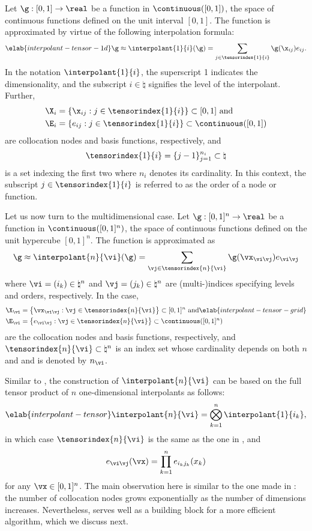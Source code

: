 Let $\g: [0, 1] \to \real$ be a function in $\continuous([0, 1])$, the space of
continuous functions defined on the unit interval $[0, 1]$. The function is
approximated by virtue of the following interpolation formula:
\begin{equation} \elab{interpolant-tensor-1d}
  \g \approx \interpolant{1}{i}(\g) = \sum_{j \in \tensorindex{1}{i}} \g(\x_{ij}) e_{ij}.
\end{equation}
In the notation $\interpolant{1}{i}$, the superscript 1 indicates the
dimensionality, and the subscript $i \in \natural$ signifies the level of the
interpolant. Further,
\begin{align*}
  & \X_i = \{ \x_{ij}: j \in \tensorindex{1}{i} \} \subset [0, 1] \text{ and} \\
  & \E_i = \{ e_{ij}: j \in \tensorindex{1}{i} \} \subset \continuous([0, 1])
\end{align*}
are collocation nodes and basis functions, respectively, and
\[
  \tensorindex{1}{i} = \{ j - 1 \}_{j = 1}^{n_i} \subset \natural
\]
is a set indexing the first two where $n_i$ denotes its cardinality. In this
context, the subscript $j \in \tensorindex{1}{i}$ is referred to as the order of
a node or function.

Let us now turn to the multidimensional case. Let $\g: [0, 1]^n \to \real$ be a
function in $\continuous([0, 1]^n)$, the space of continuous functions defined
on the unit hypercube $[0, 1]^n$. The function is approximated as
\[
  \g \approx \interpolant{n}{\vi}(\g)
  = \sum_{\vj \in \tensorindex{n}{\vi}} \g(\vx_{\vi \vj}) e_{\vi \vj}
\]
where $\vi = (i_k) \in \natural^n$ and $\vj = (j_k) \in \natural^n$ are
(multi-)indices specifying levels and orders, respectively. In the case,
\begin{align}
  & \X_{\vi} = \left\{ \vx_{\vi \vj}: \vj \in \tensorindex{n}{\vi} \right\} \subset [0, 1]^n \text{ and} \elab{interpolant-tensor-grid} \\
  & \E_{\vi} = \left\{ e_{\vi \vj}: \vj \in \tensorindex{n}{\vi} \right\} \subset \continuous([0, 1]^n) \nonumber
\end{align}
are the collocation nodes and basis functions, respectively, and
$\tensorindex{n}{\vi} \subset \natural^n$ is an index set whose cardinality
depends on both $n$ and \vi and is denoted by $n_{\vi}$.

Similar to , the construction of $\interpolant{n}{\vi}$
can be based on the full tensor product of $n$ one-dimensional interpolants as
follows:
\begin{equation} \elab{interpolant-tensor}
  \interpolant{n}{\vi} = \bigotimes_{k = 1}^n \interpolant{1}{i_k},
\end{equation}
in which case $\tensorindex{n}{\vi}$ is the same as the one in
, and
\[
  e_{\vi \vj}(\vx) = \prod_{k = 1}^n e_{i_k j_k}(x_k)
\]
for any $\vx \in [0, 1]^n$. The main observation here is similar to the one made
in : the number of collocation nodes grows
exponentially as the number of dimensions increases. Nevertheless,
 serves well as a building block for a more efficient
algorithm, which we discuss next.

